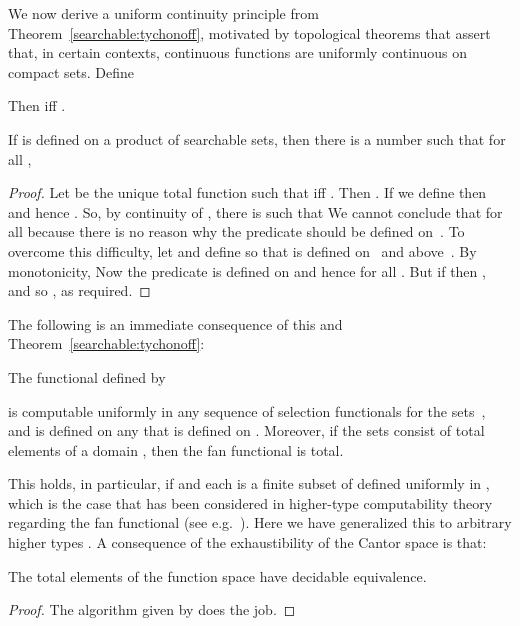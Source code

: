 \documentclass{LMCS}
\newcommand{\licsmath}[1]{}
\begin{document}
We now derive a uniform continuity principle from
Theorem~\ref{searchable:tychonoff}, motivated by topological theorems
that assert that, in certain contexts, continuous functions are
uniformly continuous on compact sets. Define
 
Then  iff .

\begin{thm} \label{uniform:cont} If 
  is defined on a product  of searchable sets, then there
  is a number  such that for all ,
  \,\,\licsmath{\alpha =_n \alpha' \implies f(\alpha)=f(\alpha').}
\end{thm}
\begin{proof}
  Let  be the unique
  total function such that
 iff . 
Then .  If we define 
  then  and hence . So, by continuity of , there
  is  such that  We cannot conclude that
   for all 
  because there is no reason why the predicate  should be defined on~.  To overcome this difficulty, let  and define
   so that
   is defined on~ and
  above~. By monotonicity,  Now the predicate
   is defined on  and hence  for all .  But if  then ,
  and so , as required.
\end{proof}


\medskip
The following is an immediate consequence of this and
Theorem~\ref{searchable:tychonoff}:
\begin{cor} \label{fan}
  The functional  defined by

is computable uniformly in any sequence of selection functionals for
the sets~, and is defined on any  that is defined
on . Moreover, if the sets  consist of total
elements of a domain , then the fan functional is total.
\end{cor}
This holds, in particular, if  and each  is a finite
subset of  defined uniformly in , which is the case that has
been considered in higher-type computability theory regarding the fan
functional (see e.g.~\cite{gandy77}).
Here we have generalized this to
arbitrary higher types .
A consequence of the exhaustibility of the Cantor space is that:
\begin{cor}\label{decidable:equivalence}
  The total elements of the function space 
  have decidable equivalence.
\end{cor}
\begin{proof}
  The algorithm  given by  
  does the job.
\end{proof}
\end{document}
